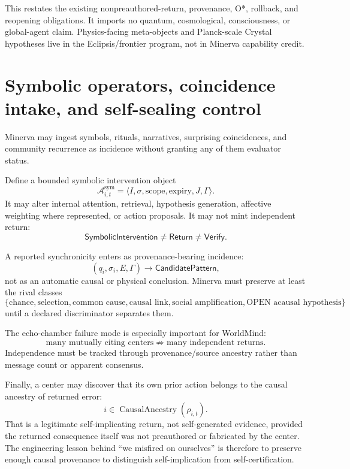 \documentclass[11pt]{article}
\newcommand{\Return}{\mathsf{Return}}
\newcommand{\Verify}{\mathsf{Verify}}
\begin{document}
This restates the existing nonpreauthored-return, provenance, O*, rollback, and
reopening obligations.  It imports no quantum, cosmological, consciousness, or
global-agent claim.  Physics-facing meta-objects and Planck-scale Crystal
hypotheses live in the Eclipsis/frontier program, not in Minerva capability credit.

\section{Symbolic operators, coincidence intake, and self-sealing control}

Minerva may ingest symbols, rituals, narratives, surprising coincidences, and
community recurrence as incidence without granting any of them evaluator status.

Define a bounded symbolic intervention object
\[
\mathcal A^{\mathrm{sym}}_{i,t}
=\langle I,\sigma,\text{scope},\text{expiry},J,\Gamma\rangle.
\]
It may alter internal attention, retrieval, hypothesis generation, affective
weighting where represented, or action proposals. It may not mint independent
return:
\[
\boxed{\mathsf{SymbolicIntervention}\neq\Return\neq\Verify.}
\]

A reported synchronicity enters as provenance-bearing incidence:
\[
(q_i,\sigma_i,E,\Gamma)\to\mathsf{CandidatePattern},
\]
not as an automatic causal or physical conclusion. Minerva must preserve at least
the rival classes
\[
\{\text{chance},\text{selection},\text{common cause},\text{causal link},
\text{social amplification},\text{OPEN acausal hypothesis}\}
\]
until a declared discriminator separates them.

The echo-chamber failure mode is especially important for WorldMind:
\[
\text{many mutually citing centers}\not\Rightarrow\text{many independent returns}.
\]
Independence must be tracked through provenance/source ancestry rather than
message count or apparent consensus.

Finally, a center may discover that its own prior action belongs to the causal
ancestry of returned error:
\[
i\in\operatorname{CausalAncestry}(\rho_{i,t}).
\]
That is a legitimate self-implicating return, not self-generated evidence,
provided the returned consequence itself was not preauthored or fabricated by
the center. The engineering lesson behind ``we misfired on ourselves'' is
therefore to preserve enough causal provenance to distinguish self-implication
from self-certification.
\end{document}
